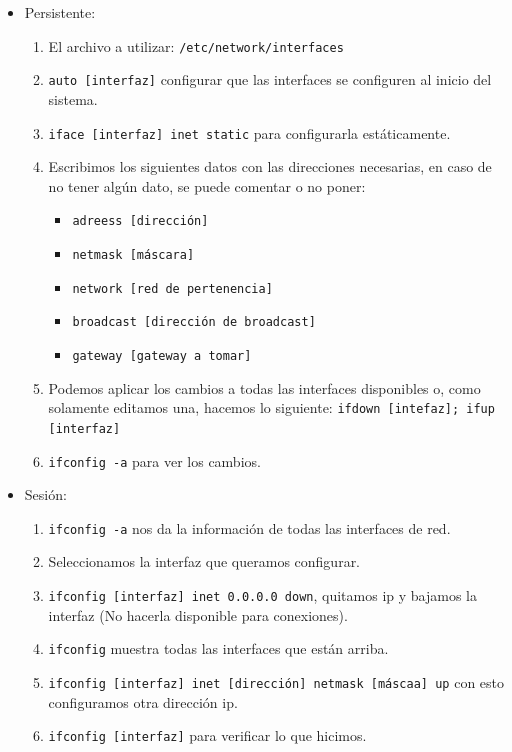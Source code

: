 \documentclass[spanish,12pt,letterpaper]{article}
\begin{document}
\begin{itemize}
  \begin{itemize}
  \item Persistente:
    \begin{enumerate}
    \item El archivo a utilizar: \texttt{/etc/network/interfaces}
    \item \texttt{auto [interfaz]} configurar que las interfaces se configuren al
      inicio del sistema.
    \item \texttt{iface [interfaz] inet static} para configurarla estáticamente.
    \item Escribimos los siguientes datos con las direcciones necesarias, en caso
      de no tener algún dato, se puede comentar o no poner:
      \begin{itemize}
      \item \texttt{adreess [dirección]}
      \item \texttt{netmask [máscara]}
      \item \texttt{network [red de pertenencia]}
      \item \texttt{broadcast [dirección de broadcast]}
      \item \texttt{gateway [gateway a tomar]}
      \end{itemize}
    \item Podemos aplicar los cambios a todas las interfaces disponibles o, como
      solamente editamos una, hacemos lo siguiente: \texttt{ifdown [intefaz];
        ifup [interfaz]}
    \item \texttt{ifconfig -a} para ver los cambios.
    \end{enumerate}
  \item Sesión:
    \begin{enumerate}
    \item \texttt{ifconfig -a} nos da la información de todas las interfaces de
      red.
    \item Seleccionamos la interfaz que queramos configurar.
    \item \texttt{ifconfig [interfaz] inet 0.0.0.0 down}, quitamos ip y bajamos
      la interfaz (No hacerla disponible para conexiones).
    \item \texttt{ifconfig} muestra todas las interfaces que están arriba.
    \item \texttt{ifconfig [interfaz] inet [dirección] netmask [máscaa] up} con
      esto configuramos otra dirección ip.
    \item \texttt{ifconfig [interfaz]} para verificar lo que hicimos.
    \end{enumerate}
  \end{itemize}
  

\end{itemize}
\end{document}
